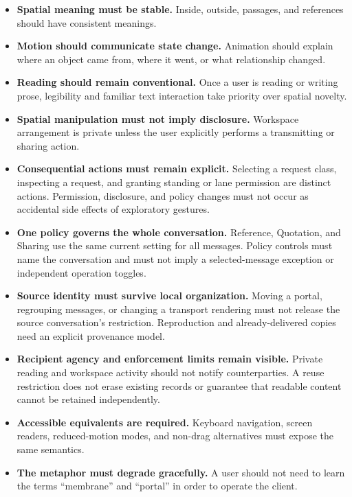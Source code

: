 \documentclass[11pt]{article}
\begin{document}
\begin{itemize}[leftmargin=*]
    \item \textbf{Spatial meaning must be stable.} Inside, outside, passages, and references should have consistent meanings.
    \item \textbf{Motion should communicate state change.} Animation should explain where an object came from, where it went, or what relationship changed.
    \item \textbf{Reading should remain conventional.} Once a user is reading or writing prose, legibility and familiar text interaction take priority over spatial novelty.
    \item \textbf{Spatial manipulation must not imply disclosure.} Workspace arrangement is private unless the user explicitly performs a transmitting or sharing action.
    \item \textbf{Consequential actions must remain explicit.} Selecting a request class, inspecting a request, and granting standing or lane permission are distinct actions. Permission, disclosure, and policy changes must not occur as accidental side effects of exploratory gestures.
    \item \textbf{One policy governs the whole conversation.} Reference, Quotation, and Sharing use the same current setting for all messages. Policy controls must name the conversation and must not imply a selected-message exception or independent operation toggles.
    \item \textbf{Source identity must survive local organization.} Moving a portal, regrouping messages, or changing a transport rendering must not release the source conversation's restriction. Reproduction and already-delivered copies need an explicit provenance model.
    \item \textbf{Recipient agency and enforcement limits remain visible.} Private reading and workspace activity should not notify counterparties. A reuse restriction does not erase existing records or guarantee that readable content cannot be retained independently.
    \item \textbf{Accessible equivalents are required.} Keyboard navigation, screen readers, reduced-motion modes, and non-drag alternatives must expose the same semantics.
    \item \textbf{The metaphor must degrade gracefully.} A user should not need to learn the terms ``membrane'' and ``portal'' in order to operate the client.
\end{itemize}
\end{document}
